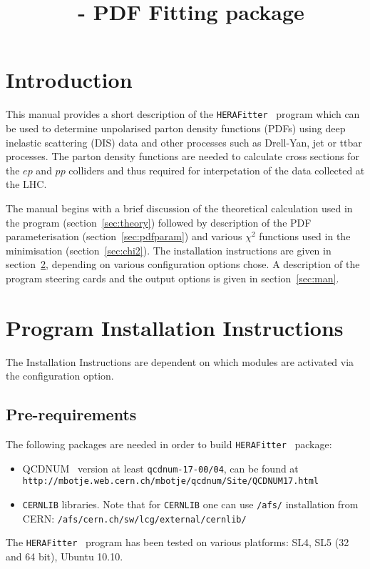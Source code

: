 \documentclass[11pt,a4paper]{article}
\title{\fitter\ - PDF Fitting package}
\newcommand\fitter{ \mbox{\tt HERAFitter} }
\begin{document}
\maketitle
\begin{abstract}
\end{abstract}
\tableofcontents
\newpage
\section{Introduction}
This manual provides a short description of the \fitter\ program 
which can be used to determine unpolarised parton density functions 
(PDFs) using deep inelastic scattering (DIS) data and other processes such as 
Drell-Yan, jet or ttbar processes.
The parton density functions are needed to calculate cross sections
for the $ep$ and $pp$ colliders and thus required for interpetation
of the data collected at the LHC.

The manual begins with a brief discussion of the theoretical calculation
used in the program (section~\ref{sec:theory}) followed by description of the
PDF parameterisation (section~\ref{sec:pdfparam}) and various $\chi^2$ functions used in the
minimisation (section~\ref{sec:chi2}). The installation instructions are given in
section~\ref{sec:install}, depending on various configuration options chose. A description of the program steering cards and
the output options is given in section~\ref{sec:man}.
\section{Program Installation Instructions} 
\label{sec:install}

The Installation Instructions are dependent on which modules are activated via the configuration option. 
\subsection{Pre-requirements}

The following packages are needed in order to build \fitter\ package:
\begin{itemize}
\item QCDNUM~\cite{qcdnum} version at least {\tt qcdnum-17-00/04}, can be found at \\
  {\tt http://mbotje.web.cern.ch/mbotje/qcdnum/Site/QCDNUM17.html}
\item {\tt CERNLIB} libraries. Note that for {\tt CERNLIB} one can use {\tt /afs/} installation from CERN:
  {\tt /afs/cern.ch/sw/lcg/external/cernlib/}
\end{itemize}
The \fitter\ program has been tested on various platforms: 
   SL4, SL5 (32 and 64 bit),  Ubuntu 10.10.
\end{document}
